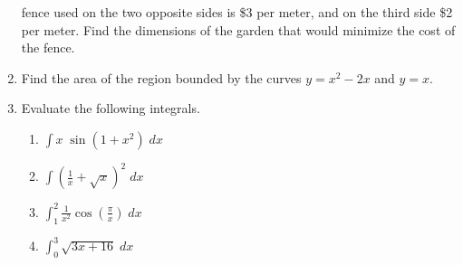 \documentclass[12pt]{article}
\newcommand{\ds}{\displaystyle}
\begin{document}
\begin{enumerate}
  fence used on the two opposite sides is \$3 per meter, and on the third
  side \$2 per meter.  Find the dimensions of the garden that would minimize
  the cost of the fence.
\vfill
\newpage
\item Find 
  the area of the region bounded by the curves $y=x^2-2x$ and $y=x$.
\vfill
\newpage
\item Evaluate
  the following integrals.
  \begin{enumerate}
  \item $\ds \int x \; \sin(1+x^2) \; dx$
\vfill
  \item $\ds \int \left(\frac{1}{x} + \sqrt{x}\right)^2 \; dx$
\vfill
  \item $\ds \int_1^2 \frac{1}{x^2} \cos\left(\frac{\pi}{x}\right) \; dx$
\vfill
  \item $\ds \int_0^3 \sqrt{3x+16} \; dx$
\vfill
  \end{enumerate}
\end{enumerate}
\end{document}
